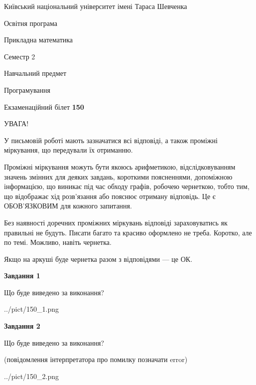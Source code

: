\documentclass[12pt, ukrainian]{article}
\begin{document}
{{\begin {small}\par
{ \center  Київський національний університет імені Тараса Шевченка \par}
{\parbox {5 cm}{Освітня програма \hfill}{\parbox {7 cm}{Прикладна математика\hfill}}\parbox {6 cm}{\hfill Семестр 2}}\par
{\parbox {5 cm} {Навчальний предмет \hfill}\parbox {7 cm}{Програмування \hfill}\parbox {6cm}{\hfill}\par}\vspace{-7pt} \end{small}}{\center Екзаменаційний білет \No \textbf
{ 150 }\par}}
{
\begin {large}
УВАГА!

У письмовій роботі мають зазначатися всі відповіді, а також проміжні міркування, що передували їх отриманню.

Проміжні міркування можуть бути якоюсь арифметикою, відслідковуванням зна\-чень змінних для деяких завдань,
короткими поясненнями, допоміжною інформацією, що виникає під час обходу графів, робочею чернеткою,
тобто тим, що відображає хід розв’язання або пояснює отриману відповідь.
Це є ОБОВ’ЯЗКОВИМ для кожного запитання.

Без наявності доречних проміжних міркувань відповіді зараховуватись як правиль\-ні не будуть.
Писати багато та красиво оформлено не треба. Коротко, але по темі. Можли\-во, навіть чернетка.

Якщо на аркуші буде чернетка разом з відповідями --- це ОК.

\newpage

{\begin {center}\textbf{Завдання 1}\end {center}}\par
Що буде виведено за виконання?\par
\begin{center}
	{../pict/150_1.png}
\end{center}
\newpage

{\begin {center}\textbf{Завдання 2}\end {center}}\par
Що буде виведено за виконання?\par
 (повідомлення інтерпретатора про помилку позначати error)\par
\begin{center}
	{../pict/150_2.png}
\end{center}
\newpage


\end{large}}
\end{document}
